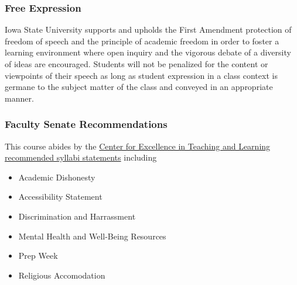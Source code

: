 \documentclass[12pt]{article}
\begin{document}
\subsubsection*{Free Expression}

Iowa State University supports and upholds the First Amendment protection of freedom of speech and the principle of academic freedom in order to foster a learning environment where open inquiry and the vigorous debate of a diversity of ideas are encouraged. Students will not be penalized for the content or viewpoints of their speech as long as student expression in a class context is germane to the subject matter of the class and conveyed in an appropriate manner.


\subsubsection*{Faculty Senate Recommendations}

This course abides by the 
\href{https://www.celt.iastate.edu/instructional-strategies/preparing-to-teach/how-to-create-an-effective-syllabus/recommended-iowa-state-university-syllabus-statements/}{Center for Excellence in Teaching and Learning recommended syllabi statements}
including
\begin{itemize}
\item Academic Dishonesty
\item Accessibility Statement
\item Discrimination and Harrassment
\item Mental Health and Well-Being Resources
\item Prep Week
\item Religious Accomodation
\end{itemize}
\end{document}
